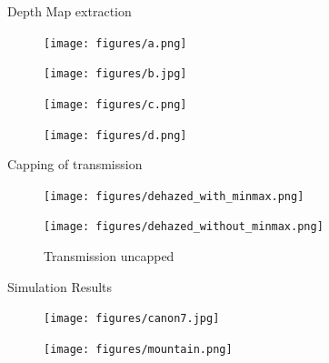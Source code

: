 \documentclass{beamer}
\begin{document}
\begin{frame}[t]{Depth Map extraction}

\begin{figure}[htbp!]
 \begin{minipage}[b]{0.45\linewidth}
    \texttt{[image: figures/a.png]}
    
\end{minipage}
\begin{minipage}[b]{0.45\linewidth}
    \texttt{[image: figures/b.jpg]}
   
\end{minipage}   
\end{figure}
\begin{figure}[htbp!]
 \begin{minipage}[b]{0.45\linewidth}
    \texttt{[image: figures/c.png]}
    
\end{minipage}
\begin{minipage}[b]{0.45\linewidth}
    \texttt{[image: figures/d.png]}
  
\end{minipage}   
\end{figure}


\end{frame}

\begin{frame}[t]{Capping of transmission}

\begin{figure}[htbp!]
 \begin{minipage}[b]{0.5\linewidth}
    \texttt{[image: figures/dehazed\_with\_minmax.png]}
    \caption{Transmission between 0.1 and 0.9}
\end{minipage}
    \begin{minipage}[b]{0.5\linewidth}
    \texttt{[image: figures/dehazed\_without\_minmax.png]}
\caption{Transmission uncapped}
	\end{minipage}   
\end{figure}


\end{frame}

\begin{frame}[t]{Simulation Results}

\begin{figure}[htbp!]
 \begin{minipage}[b]{0.45\linewidth}
    \texttt{[image: figures/canon7.jpg]}
    
\end{minipage}
    \begin{minipage}[b]{0.45\linewidth}
    \texttt{[image: figures/mountain.png]}

	\end{minipage}   
\end{figure}
\caption{Input Images with Haze}

\end{frame}
\end{document}
